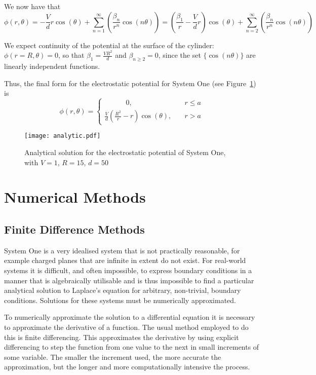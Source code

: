 \documentclass[12pt, a4paper]{article}
\newcommand{\be}{\begin{equation}}
\newcommand{\ee}{\end{equation}}
\begin{document}
We now have that
%
\be
\phi(r,\theta)=-\frac{V}{d}r\cos(\theta) + \sum_{n=1}^{\infty}(\frac{\beta_n}{r^n} \cos(n\theta))
              =(\frac{\beta_1}{r}-\frac{V}{d}r)\cos(\theta) + \sum_{n=2}^{\infty}(\frac{\beta_n}{r^n} \cos(n\theta))
\ee

We expect continuity of the potential at the surface of the cylinder:
$\phi(r=R,\theta)=0$, so that $\beta_1=\frac{VR^2}{d}$ and $\beta_{n \geq 2}=0$,
since the set $\{\cos(n\theta)\}$ are linearly independent functions.

Thus, the final form for the electrostatic potential for System One (see
Figure~\ref{fig:analytic}) is
%
\be
\phi(r,\theta)=
\begin{cases} \quad \qquad 0, & \quad r \leq a \\
\frac{V}{d}(\frac{R^2}{r}-r)\cos(\theta), & \quad r > a
\end{cases}
\ee

\begin{figure}
\begin{center}
\texttt{[image: analytic.pdf]}
\caption{Analytical solution for the electrostatic potential of System One, with $V=1$,
$R=15$, $d=50$}
\label{fig:analytic}
\end{center}
\end{figure}

\section{Numerical Methods}
\subsection{Finite Difference Methods}

System One is a very idealised system that is not practically reasonable, for example
charged planes that are infinite in extent do not exist. For real-world systems
it is difficult, and often impossible, to express boundary conditions in a manner that
is algebraically utilisable and is thus impossible to find a particular analytical
solution to Laplace's equation for arbitrary, non-trivial, boundary conditions. Solutions
for these systems must be numerically approximated.

To numerically approximate the solution to a differential equation it is
necessary to approximate the derivative of a function. The usual method employed to
do this is finite differencing. This approximates the derivative by using explicit
differencing to step the function from one value to the next in small 
increments of some variable. The smaller the increment used, the more accurate
the approximation, but the longer and more computationally intensive the process.
\end{document}

